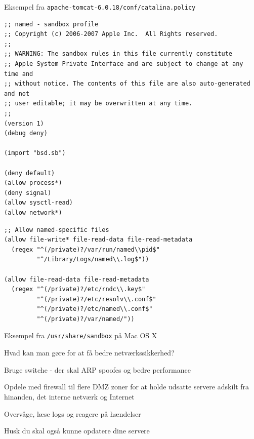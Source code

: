 \documentclass[Screen16to9,17pt]{foils}
\begin{document}
\begin{list1}
\item Eksempel fra \verb+apache-tomcat-6.0.18/conf/catalina.policy+
\end{list1}



\begin{verbatim}
;; named - sandbox profile
;; Copyright (c) 2006-2007 Apple Inc.  All Rights reserved.
;;
;; WARNING: The sandbox rules in this file currently constitute
;; Apple System Private Interface and are subject to change at any time and
;; without notice. The contents of this file are also auto-generated and not
;; user editable; it may be overwritten at any time.
;;
(version 1)
(debug deny)

(import "bsd.sb")

(deny default)
(allow process*)
(deny signal)
(allow sysctl-read)
(allow network*)
\end{verbatim}



\begin{verbatim}
;; Allow named-specific files
(allow file-write* file-read-data file-read-metadata
  (regex "^(/private)?/var/run/named\\pid$"
         "^/Library/Logs/named\\.log$"))

(allow file-read-data file-read-metadata
  (regex "^(/private)?/etc/rndc\\.key$"
         "^(/private)?/etc/resolv\\.conf$"
         "^(/private)?/etc/named\\.conf$"
         "^(/private)?/var/named/"))
\end{verbatim}

\begin{list1}
\item Eksempel fra \verb+/usr/share/sandbox+ på Mac OS X
\end{list1}




\begin{list1}
\item Hvad kan man gøre for at få bedre netværkssikkerhed?
\begin{list2}
\item Bruge switche - der skal ARP spoofes og bedre performance
\item Opdele med firewall til flere DMZ zoner for at holde
      udsatte servere adskilt fra hinanden, det interne netværk og
      Internet
\item Overvåge, læse logs og reagere på hændelser
\end{list2}
\item Husk du skal også kunne opdatere dine servere
\end{list1}
\end{document}
